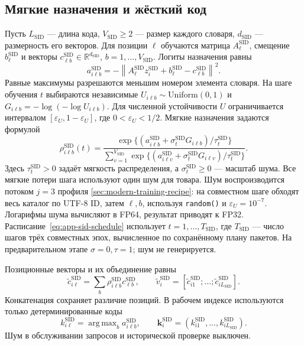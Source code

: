 \documentclass[12pt,a4paper]{article}
\newcommand{\code}[1]{{\ttfamily\small\nolinkurl{#1}}}
\newcommand{\R}{\mathbb R}
\newcommand{\eps}{\varepsilon}
\newcommand{\norm}[1]{\left\lVert#1\right\rVert}
\DeclareMathOperator*{\argmax}{arg\,max}
\theoremstyle{plainru}
\begin{document}
\subsection{Мягкие назначения и жёсткий код}
\label{sec:sid-codes}

Пусть $L_{\mathrm{SID}}$ --- длина кода,
$V_{\mathrm{SID}}\ge2$ --- размер каждого словаря,
$d_{\mathrm{SID}}$ --- размерность его векторов.
Для позиции $\ell$ обучаются матрица $A_\ell^{\mathrm{SID}}$,
смещение $b_\ell^{\mathrm{SID}}$ и векторы
$c_{\ell b}^{\mathrm{SID}}\in\R^{d_{\mathrm{SID}}}$,
$b=1,\ldots,V_{\mathrm{SID}}$. Логиты назначения равны
\begin{equation}\label{eq:sid-logits}
 a_{i\ell b}^{\mathrm{SID}}
 =-\norm{A_\ell^{\mathrm{SID}}z_i^{\mathrm{SID}}
       +b_\ell^{\mathrm{SID}}-c_{\ell b}^{\mathrm{SID}}}^{2}.
\end{equation}
Равные максимумы разрешаются меньшим номером элемента словаря.
На шаге обучения $t$ выбираются независимые
$U_{i\ell b}\sim\mathrm{Uniform}(0,1)$ и
$G_{i\ell b}=-\log(-\log U_{i\ell b})$.
Для численной устойчивости $U$ ограничивается интервалом
$[\eps_U,1-\eps_U]$, где $0<\eps_U<1/2$.
Мягкие назначения задаются формулой
\begin{equation}\label{eq:sid-soft}
 \rho_{i\ell b}^{\mathrm{SID}}(t)=
 \frac{\exp\{(a_{i\ell b}^{\mathrm{SID}}
                 +\sigma_t^{\mathrm{SID}}G_{i\ell b})/
                    \tau_t^{\mathrm{SID}}\}}
 {\sum_{v=1}^{V_{\mathrm{SID}}}
  \exp\{(a_{i\ell v}^{\mathrm{SID}}
                 +\sigma_t^{\mathrm{SID}}G_{i\ell v})/
                    \tau_t^{\mathrm{SID}}\}}.
\end{equation}
Здесь $\tau_t^{\mathrm{SID}}>0$ задаёт мягкость распределения,
а $\sigma_t^{\mathrm{SID}}\ge0$ --- масштаб шума.
Все мягкие потери шага используют один шум для товара.
Шум воспроизводится потоком $j=3$ профиля
\ref{sec:modern-training-recipe}: на совместном шаге обходят весь
каталог по UTF-8 ID, затем $\ell,b$, используя \code{random()} и
$\eps_U=10^{-7}$. Логарифмы шума вычисляют в FP64, результат приводят
к FP32. Расписание~\eqref{eq:app-sid-schedule} использует
$t=1,\ldots,T_{\mathrm{SID}}$, где $T_{\mathrm{SID}}$ --- число шагов
трёх совместных эпох, вычисленное по сохранённому плану пакетов.
На предварительном этапе $\sigma=0,\tau=1$; шум не генерируется.

Позиционные векторы и их объединение равны
\begin{equation}\label{eq:sid-soft-vector}
 \widetilde c_{i\ell}^{\mathrm{SID}}
 =\sum_b\rho_{i\ell b}^{\mathrm{SID}}c_{\ell b}^{\mathrm{SID}},
 \qquad
 \widetilde v_i^{\mathrm{SID}}
 =[\widetilde c_{i1}^{\mathrm{SID}};\ldots;
   \widetilde c_{iL_{\mathrm{SID}}}^{\mathrm{SID}}].
\end{equation}
Конкатенация сохраняет различие позиций. В рабочем индексе
используются только детерминированные коды
\begin{equation}\label{eq:sid-hard}
 k_{i\ell}^{\mathrm{SID}}=\argmax_b a_{i\ell b}^{\mathrm{SID}},
 \qquad
 \mathbf k_i^{\mathrm{SID}}
 =(k_{i1}^{\mathrm{SID}},\ldots,k_{iL_{\mathrm{SID}}}^{\mathrm{SID}}).
\end{equation}
Шум в обслуживании запросов и исторической проверке выключен.
\end{document}
